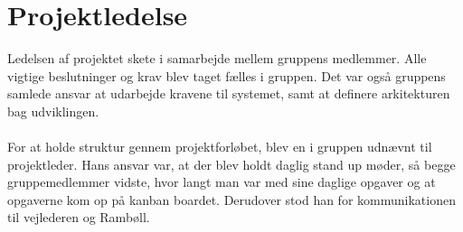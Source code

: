 \section{Projektledelse}
Ledelsen af projektet skete i samarbejde mellem gruppens medlemmer. Alle vigtige beslutninger og krav blev taget fælles i gruppen.
Det var også gruppens samlede ansvar at udarbejde kravene til systemet, samt at definere arkitekturen bag udviklingen. \\ \\
For at holde struktur gennem projektforløbet, blev en i gruppen udnævnt til projektleder. Hans ansvar var, at der blev holdt daglig stand up møder, så begge gruppemedlemmer vidste, hvor langt man var med sine daglige opgaver og at opgaverne kom op på kanban boardet. Derudover stod han for kommunikationen til vejlederen og Rambøll. \\
